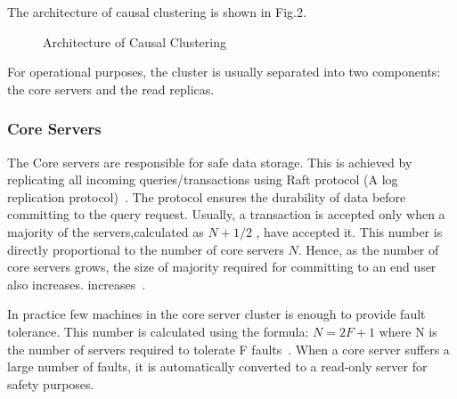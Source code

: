 \documentclass[9pt,twocolumn,twoside]{../../styles/osajnl}
\begin{document}
The architecture of causal clustering is shown in Fig.2. 
\begin{figure}[htbp]
\centering
{}
\caption{Architecture of Causal Clustering ~\cite{www-neo4j-causal}}
\label{fig:false-color}
\end{figure}

For operational purposes, the cluster is usually separated into two components: the core servers and the read replicas. 
\subsubsection{Core Servers}
The Core servers are responsible for safe data storage. This is achieved by replicating all incoming queries/transactions using Raft protocol (A log replication protocol)~\cite{www-neo4j-causal}. The protocol ensures the durability of data before committing to the query request. Usually, a transaction is accepted only when a majority of the servers,calculated as $N+1/2$ , have accepted it. This number is directly proportional to the number of core servers $N$. Hence, as the number of core servers grows, the size of majority required for committing to an end user also increases. increases~\TE \cite{www-neo4j-causal}. 

In practice few machines \GE in the core server cluster is enough to provide fault tolerance. This number is calculated using the formula: $N = 2F +1 $ where N is the number of servers required to tolerate F faults~\cite{www-neo4j-causal}.  When a core server suffers a large number of faults, it is automatically converted to a read-only server for safety purposes. 
\end{document}
